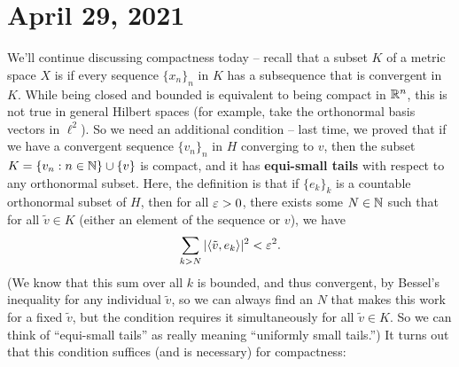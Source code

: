 \pagebreak\section{April 29, 2021}

We'll continue discussing compactness today -- recall that a subset $K$ of a metric space $X$ is  if every sequence $\{x_n\}_n$ in $K$ has a subsequence that is convergent in $K$. While being closed and bounded is equivalent to being compact in $\mathbb R^n$, this is not true in general Hilbert spaces (for example, take the orthonormal basis vectors in $\ell^2$). So we need an additional condition -- last time, we proved that if we have a convergent sequence $\{v_n\}_n$ in $H$ converging to $v$, then the subset $K = \{v_n: n \in \mathbb N\} \cup \{v\}$ is compact, and it has \textbf{equi-small tails} with respect to any orthonormal subset. Here, the definition is that if $\{e_k\}_k$ is a countable orthonormal subset of $H$, then for all $\varepsilon > 0$, there exists some $N \in \mathbb N$ such that for all $\tilde{v} \in K$ (either an element of the sequence or $v$), we have 
\[
    \sum_{k > N} |\langle \tilde{v}, e_k \rangle|^2 < \varepsilon^2.
\]
(We know that this sum over all $k$ is bounded, and thus convergent, by Bessel's inequality for any individual $\tilde{v}$, so we can always find an $N$ that makes this work for a fixed $\tilde{v}$, but the condition requires it simultaneously for all $\tilde{v} \in K$. So we can think of ``equi-small tails'' as really meaning ``uniformly small tails.'') It turns out that this condition suffices (and is necessary) for compactness:

